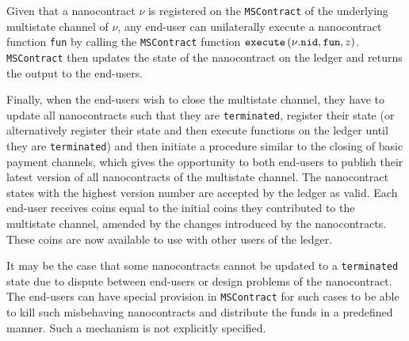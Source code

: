     Given that a nanocontract $\nu$ is registered on the \texttt{MSContract} of the
    underlying multistate channel of $\nu$, any end-user can unilaterally execute a
    nanocontract function \texttt{fun} by calling the \texttt{MSContract} function
    $\mbox{\texttt{execute}}\left(\nu\mbox{.\texttt{nid}}, \mbox{\texttt{fun}}, z\right)$.
    \texttt{MSContract} then updates the state of the nano\-contract on the ledger and
    returns the output to the end-users.

    Finally, when the end-users wish to close the multistate channel, they have to update
    all nanocontracts such that they are \texttt{terminated}, register their state (or
    alternatively register their state and then execute functions on the ledger until they
    are \texttt{terminated}) and then initiate a procedure similar to the closing of basic
    payment channels, which gives the opportunity to both end-users to publish their
    latest version of all nanocontracts of the multistate channel. The nanocontract states
    with the highest version number are accepted by the ledger as valid. Each end-user
    receives coins equal to the initial coins they contributed to the multistate channel,
    amended by the changes introduced by the nanocontracts. These coins are now available
    to use with other users of the ledger.

    It may be the case that some nanocontracts cannot be updated to a \texttt{terminated}
    state due to dispute between end-users or design problems of the nanocontract. The
    end-users can have special provision in \texttt{MSContract} for such cases to be able
    to kill such misbehaving nanocontracts and distribute the funds in a predefined
    manner. Such a mechanism is not explicitly specified.

